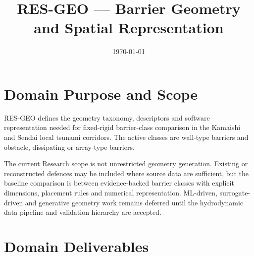 \documentclass[12pt,a4paper]{article}
\title{RES-GEO --- Barrier Geometry and Spatial Representation}
\author{}
\date{\today}
\begin{document}
\maketitle

\tableofcontents
\clearpage

\section{Domain Purpose and Scope}
\label{sec:res-geo-domain-purpose}

RES-GEO defines the geometry taxonomy, descriptors and software
representation needed for fixed-rigid barrier-class comparison in the
Kamaishi and Sendai local tsunami corridors. The active classes are
wall-type barriers and obstacle, dissipating or array-type barriers.

The current Research scope is not unrestricted geometry generation.
Existing or reconstructed defences may be included where source data
are sufficient, but the baseline comparison is between evidence-backed
barrier classes with explicit dimensions, placement rules and numerical
representation. ML-driven, surrogate-driven and generative geometry
work remains deferred until the hydrodynamic data pipeline and
validation hierarchy are accepted.

\section{Domain Deliverables}
\label{sec:res-geo-domain-deliverables}









\clearpage
\printbibliography[
  heading=bibintoc,
  title={References}
]
\end{document}
